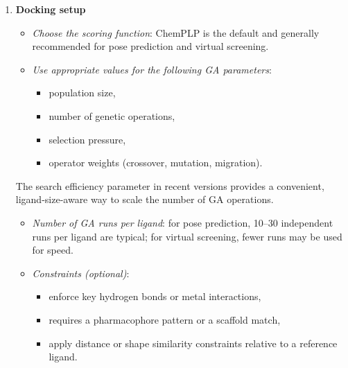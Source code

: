 \documentclass[12pt]{article}
\begin{document}
\begin{enumerate}
\begin{enumerate}
    \item Build ligands or import from databases and generate 3D structures.
    \item Enumerate all possible tautomers at the physiological pH; many failures in docking arise from incorrect protonation states.
    \item Optimise ligand geometry using a suitable small-molecule force field; GOLD will sample conformations during docking; however, a reasonable starting structure ensures high-quality results.
    \item GOLD automatically detects rotatable bonds; however, manual curation (e.g. ring amides, conjugated bonds) is sometimes necessary.
\end{enumerate}

\item \textbf{Docking setup}

\begin{itemize}
    \item \emph{Choose the scoring function}: ChemPLP is the default and generally recommended for pose prediction and virtual screening.
    \item \emph{Use appropriate values for the following GA parameters}:
    \begin{itemize}
        \item population size,
        \item number of genetic operations,
        \item selection pressure,
        \item operator weights (crossover, mutation, migration).
    \end{itemize}
\end{itemize}
The search efficiency parameter in recent versions provides a convenient, ligand-size-aware way to scale the number of GA operations.
\begin{itemize}
    \item \emph{Number of GA runs per ligand}: for pose prediction, 10--30 independent runs per ligand are typical; for virtual screening, fewer runs may be used for speed.
    \item \emph{Constraints (optional)}:
    \begin{itemize}
        \item enforce key hydrogen bonds or metal interactions,
        \item requires a pharmacophore pattern or a scaffold match,
        \item apply distance or shape similarity constraints relative to a reference ligand.
    \end{itemize}
\end{itemize}


\end{enumerate}
\end{document}
